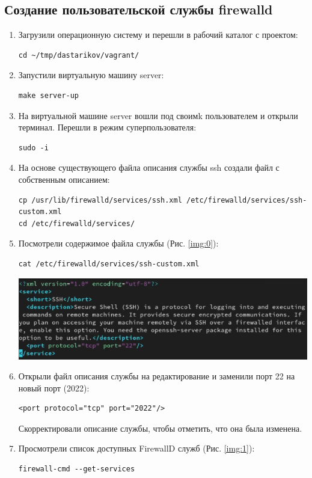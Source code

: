 \subsection{Создание пользовательской службы firewalld}
\begin{enumerate}
\item Загрузили операционную систему и перешли в рабочий каталог с проектом:
    \begin{verbatim}
cd ~/tmp/dastarikov/vagrant/
    \end{verbatim}
\item Запустили виртуальную машину server:
    \begin{verbatim}
make server-up
    \end{verbatim}
\item На виртуальной машине server вошли под своимk пользователем и открыли терминал. Перешли в режим суперпользователя:
    \begin{verbatim}
sudo -i
    \end{verbatim}
\item На основе существующего файла описания службы ssh создали файл с собственным описанием:
    \begin{verbatim}
cp /usr/lib/firewalld/services/ssh.xml /etc/firewalld/services/ssh-custom.xml
cd /etc/firewalld/services/
    \end{verbatim}
\item Посмотрели содержимое файла службы (Рис. \ref{img:0}):
    \begin{verbatim}
cat /etc/firewalld/services/ssh-custom.xml
    \end{verbatim}

\begin{center}
    \centering
    \includegraphics[width=\textwidth]{../images/image00.png}
    \label{img:0}
\end{center}

\item Открыли файл описания службы на редактирование и заменили порт 22 на новый
порт (2022):
    \begin{verbatim}
<port protocol="tcp" port="2022"/>
    \end{verbatim}
    Скорректировали описание службы, чтобы отметить, что она была изменена.
\item Просмотрели список доступных FirewallD служб (Рис. \ref{img:1}):
    \begin{verbatim}
firewall-cmd --get-services
    \end{verbatim}


\end{enumerate}
